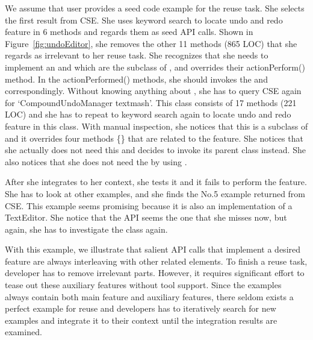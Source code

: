 We assume that user provides a seed code example for the reuse task. She selects the first result from CSE. She uses keyword search to locate undo and redo feature in 6 methods and regards them as  seed API calls. Shown in Figure~\ref{fig:undoEditor}, she removes  the other  11 methods (865 LOC) that she regards as irrelevant to her reuse task. She recognizes that she needs to implement an  and  which are the subclass of , and overrides their actionPerform() method. In the actionPerformed() methods, she should invokes the  and   correspondingly. Without knowing anything about , she has to query CSE again for `CompoundUndoManager textmash'. This class consists of 17 methods (221 LOC) and she has to repeat to keyword search again to locate undo and redo feature in this class. With manual inspection, she notices that this  is a subclass of  and it overrides four methods \{\} that are related to the feature. She notices that she actually does not need this  and decides to invoke its parent class   instead. She also notices that she does not need the  by using . 

After she integrates  to her context, she tests it and it fails to perform the feature. She has to look at other examples, and she finds the No.5 example returned from CSE.  This example seems promising because it is also an implementation of a TextEditor. She notice that  the API  seems the one that she misses now, but again, she has to investigate the class    again. 

With this example, we illustrate that salient API calls that implement a desired feature are always interleaving with other related elements. To finish a reuse task, developer has to remove irrelevant parts.  However, it  requires significant effort to tease out these auxiliary features without tool support. Since the examples always contain both main feature and auxiliary features,  there seldom exists a perfect example for reuse and developers has to iteratively search for new examples and integrate it to their context until the integration results are examined.     

